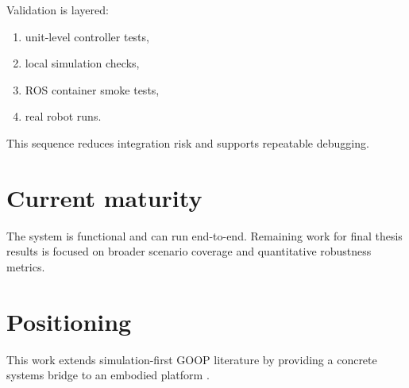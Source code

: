 Validation is layered:

\begin{enumerate}
    \item unit-level controller tests,
    \item local simulation checks,
    \item ROS container smoke tests,
    \item real robot runs.
\end{enumerate}

This sequence reduces integration risk and supports repeatable debugging.

\section{Current maturity}

The system is functional and can run end-to-end. Remaining work for final thesis
results is focused on broader scenario coverage and quantitative robustness
metrics.

\section{Positioning}

This work extends simulation-first GOOP literature by providing a concrete
systems bridge to an embodied platform \cite{duckietown:2017,delasheras:2025}.
